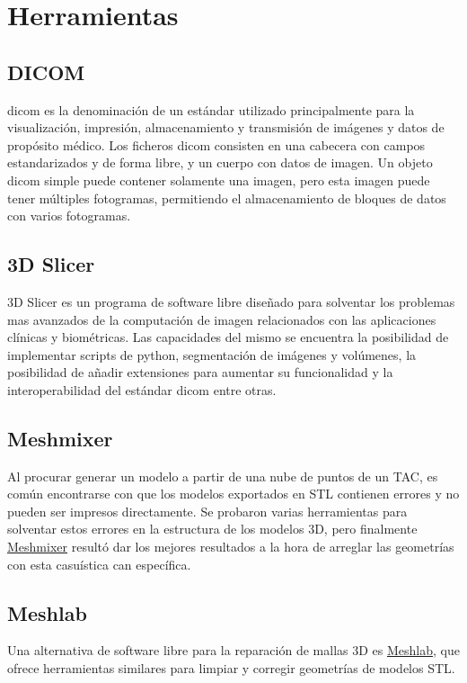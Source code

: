 \section{Herramientas}
    \subsection{DICOM}
    \acrshort{dicom} es la denominación de un estándar utilizado principalmente para la visualización, impresión, almacenamiento y transmisión de imágenes y datos de propósito médico.
    Los ficheros \acrshort{dicom} consisten en una cabecera con campos estandarizados y de forma libre, y un cuerpo con datos de imagen. Un objeto \acrshort{dicom} simple puede contener solamente una imagen, pero esta imagen puede tener múltiples fotogramas, permitiendo el almacenamiento de bloques de datos con varios fotogramas.
   
    \subsection{3D Slicer}
3D Slicer es un programa de software libre diseñado para solventar los problemas mas avanzados de la computación de imagen relacionados con las aplicaciones clínicas y biométricas. Las capacidades del mismo se encuentra la  posibilidad de implementar scripts de python, segmentación de imágenes y volúmenes, la posibilidad de añadir extensiones para aumentar su funcionalidad y la interoperabilidad del estándar \acrshort{dicom} entre otras.

\subsection{Meshmixer}
Al procurar generar un modelo a partir de una nube de puntos de un TAC, es común encontrarse con que los modelos exportados en STL contienen errores y no pueden ser impresos directamente. Se probaron varias herramientas para solventar estos errores en la estructura de los modelos 3D, pero finalmente \href{https://www.meshmixer.com}{Meshmixer} resultó dar los mejores resultados a la hora de arreglar las geometrías con esta casuística can específica.
    \subsection{Meshlab}
Una alternativa de software libre para la reparación de mallas 3D es \href{https://www.meshlab.net}{Meshlab}, que ofrece herramientas similares para limpiar y corregir geometrías de modelos STL.
